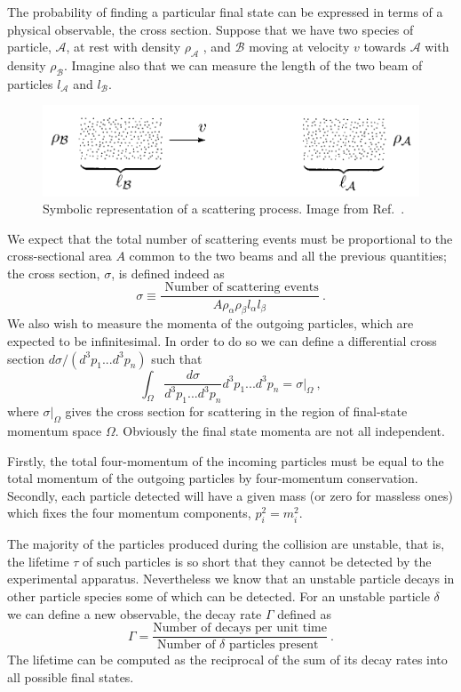 \documentclass[../main/main.tex]{subfiles}
\begin{document}
The probability of finding a particular final state can be expressed in terms of a physical observable, the cross section.
Suppose that we have two species of particle, $\mathcal{A}$, at rest with density $\rho_\mathcal{A}$ , and $\mathcal{B}$ moving at velocity $v$ towards $\mathcal{A}$ with density $\rho_\mathcal{B}$. Imagine also that we can measure the length of the two beam of particles $l_\mathcal{A}$ and $l_\mathcal{B}$. 

\begin{figure}[h]
	\centering
	\includegraphics[width=12cm]{../images/peskin.png}
	\caption{Symbolic representation of a scattering process. Image from Ref.~\cite{Peskin:1995ev}.}
	\label{Potential}
\end{figure}

We expect that the total number of scattering events must be proportional to the cross-sectional area $A$ common to the two beams and all the previous quantities; the cross section, $\sigma$, is defined indeed as
\begin{equation}
	\sigma \equiv \frac{\text{ Number of scattering events}}{A \rho_\alpha \rho_\beta  l_\alpha l_\beta} \ .
\end{equation}
We also wish to measure the momenta of the outgoing particles, which are expected to be infinitesimal. In order to do so we can define a differential cross section $ d \sigma/(d^3p_1...d^3p_n)$ such that
\begin{equation}
	\int_\Omega \frac{ d \sigma}{d^3p_1...d^3p_n}d^3p_1...d^3p_n = \sigma|_\Omega \ ,
\end{equation}
where $\sigma|_\Omega$ gives the cross section for scattering in the region of final-state momentum space $\Omega$. Obviously the final state momenta are not all independent.

Firstly, the total four-momentum of the incoming particles must be equal to the total momentum of the outgoing particles by four-momentum conservation. Secondly, each particle detected will have a given mass (or zero for massless ones) which fixes the four momentum components, $p_i^2 = m_i^2$.

The majority of the particles produced during the collision are unstable, that is, the lifetime $\tau$ of 
such particles is so short that they cannot be detected by the experimental apparatus.
Nevertheless we know that an unstable particle decays in other particle species some of which can be detected. 
For an unstable particle $\delta$  we can define a new observable, the decay rate $\Gamma$ defined as 
\begin{equation}
	\Gamma = \frac{\text{Number of decays per unit time}}{\text{Number of  $\delta$  particles present }} \ .
\end{equation}
The lifetime can be computed as the reciprocal of the sum of its decay rates into all possible final states.
\end{document}
